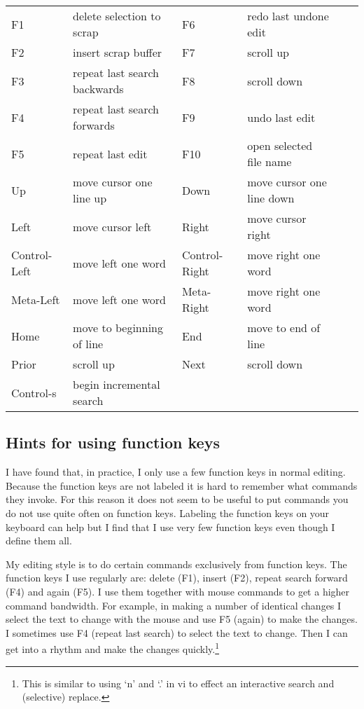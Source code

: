 \begin{tabular}{llllll}
F1 & delete selection to scrap & F6 & redo last undone edit \\
F2 & insert scrap buffer & F7 & scroll up \\
F3 & repeat last search backwards & F8 & scroll down \\
F4 & repeat last search forwards & F9 & undo last edit \\
F5 & repeat last edit & F10 & open selected file name \\
Up & move cursor one line up & Down & move cursor one line down \\
Left & move cursor left & Right & move cursor right \\
Control-Left & move left one word & Control-Right & move right one word  \\
Meta-Left & move left one word & Meta-Right & move right one word  \\
Home & move to beginning of line & End & move to end of line  \\
Prior & scroll up & Next & scroll down  \\
Control-s & begin incremental search \\
\end{tabular}



\subsection{Hints for using function keys}

I have found that, in practice, I only use a few function keys
in normal editing.
Because the function keys are not labeled it is hard to remember
what commands they invoke.
For this reason it does not seem to be useful to put commands you
do not use quite often on function keys.
Labeling the function keys on your keyboard can help but I find
that I use very few function keys even though I define them all.

My editing style is to do certain commands exclusively from function keys.
The function keys I use regularly are: delete (F1), insert (F2),
repeat search forward (F4) and again (F5).
I use them together with mouse commands to get a higher command bandwidth.
For example, in making a number of identical changes I select the
text to change with the mouse and use F5 (again) to make the changes.
I sometimes use F4 (repeat last search) to select the text to change.
Then I can get into a rhythm and make the changes quickly.\footnote{
	This is similar to using `n' and `.' in vi to effect an
	interactive search and (selective) replace.}

